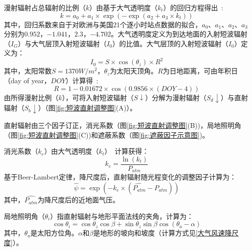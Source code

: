 漫射辐射占总辐射的比例（$k$）由基于大气透明度（$k_{t}$）的回归方程得出~\citep{ruizarias2010}:
\begin{equation}
k=a_{0}+a_{1} \times \exp \left(- \exp \left( a_{2}+a_{3} \times k_{t} \right) \right)
\end{equation}
其中，回归系数来自于对欧洲与美国21个逐小时站点数据的拟合，$a_{0}$、$a_{1}$、$a_{2}$、$a_{3}$分别为$0.952$，$-1.041$，$2.3$，$-4.702$。大气透明度定义为到达地面的入射短波辐射（$I_{G}$）与大气层顶入射短波辐射（$I_{0}$）的比值。大气层顶的入射短波辐射（$I_{0}$）定义为：
\begin{equation}
I_{0}=S \times \cos{\left(\theta_{z}\right)} \times R^{2}
\end{equation}
其中，太阳常数$S=1370W/m^{2}$，$\theta_{z}$为太阳天顶角。$R$为日地距离，可由年积日（day of year，$DOY$）计算得~\citep{eva1998}:
\begin{equation}
R=1-0.01672 \times \cos{\left( 0.9856 \times \left(DOY-4 \right)\right)}
\end{equation}
由所得漫射比例（$k$），可将入射短波辐射（$S\downarrow$）分解为漫射辐射（$S_{d}\downarrow$）与直射辐射（$S_{b}\downarrow$）（图\ref{fig:短波直射调整图}(A)）。

直射辐射由三个因子订正，消光系数（图\ref{fig:短波直射调整图}(B))，局地照明角（图\ref{fig:短波直射调整图}(C))和遮蔽系数（图\ref{fig:遮蔽因子示意图})。

消光系数（$k_{e}$）由大气透明度（$k_{t}$）~\citep{gupta2016}计算获得：
\begin{equation}
k_{e}=\frac{\ln{\left(k_{t}\right)}}{P_{a t m}}
\end{equation}
基于Beer-Lambert定律，降尺度后，直射辐射随光程变化的调整因子计算为：
\begin{equation}
\hat{\psi}=\exp{\left( -k_{e} \times \left(\hat{P_{a t m}}-P_{a t m} \right) \right)} 
\end{equation}
其中，$\hat{P_{a t m}}$为降尺度后的近地面气压。

局地照明角（$\theta_{i}$）指直射辐射与地形平面法线的夹角，计算为：
\begin{equation}
\cos{\theta_{i}}=\cos{\theta_{z}}\cos{\beta}+\sin{\theta_{z}}\sin{\beta}\cos{\left(\theta_{a}-\alpha\right)}
\end{equation}
其中，$\theta_{a}$是太阳方位角。$\alpha$和$\beta$是地形的坡向和坡度（计算方式见\ref{大气风速降尺度}）。

